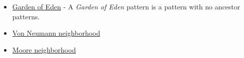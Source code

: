 \begin{Datorarbete}
        \begin{itemize}
                \item \href{https://en.wikipedia.org/wiki/Garden_of_Eden_(cellular_automaton)}{Garden of Eden} - A \emph{Garden of Eden} pattern is a pattern with no ancestor patterns.
                \item \href{https://en.wikipedia.org/wiki/Von_Neumann_neighborhood}{Von Neumann neighborhood}
                \item \href{https://en.wikipedia.org/wiki/Moore_neighborhood}{Moore neighborhood}
        \end{itemize}


\end{Datorarbete}
